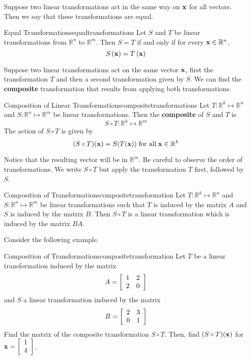 Suppose two linear transformations act in the same way on ${\bf x}$ for all vectors. Then we say that these transformations are equal.

\begin{definition}{Equal Transformations}{equaltransformations}
Let $S$ and $T$ be linear transformations from $\mathbb{R}^n$ to $\mathbb{R}^m$. Then $S = T$ if and only if for every ${\bf x} \in \mathbb{R}^n$, 
\[
S \left( {\bf x} \right) = T \left( {\bf x} \right)
\]
\end{definition}

Suppose two linear transformations act on the same vector ${\bf x}$, first the transformation $T$ and then a second transformation given by $S$. We can find the \textbf{composite} transformation that results from applying both transformations.

\begin{definition}{Composition of Linear Transformations}{compositetransformations}
Let $T: \mathbb{R}^k \mapsto \mathbb{R}^n$ and $S: \mathbb{R}^n \mapsto \mathbb{R}^m$ be linear transformations. Then the \textbf{composite} of $S$ and $T$ is 
\[
S \circ T: \mathbb{R}^k \mapsto \mathbb{R}^m
\]
The action of $S \circ T$ is given by 
\[
(S \circ T) ({\bf x}) = S(T({\bf x})) \; \mbox{for all} \; {\bf x} \in \mathbb{R}^k
\]
\end{definition}

Notice that the resulting vector will be in $\mathbb{R}^m$. Be careful to observe the order of transformations. We write $S \circ T$ but apply the transformation $T$ first, followed by $S$. 

\begin{theorem}{Composition of Transformations}{compositetransformation}
Let $T: \mathbb{R}^k \mapsto \mathbb{R}^n$ and $S: \mathbb{R}^n \mapsto \mathbb{R}^m$ be linear transformations such that $T$ is induced by the matrix $A$ and $S$ is induced by the matrix $B$. Then $S \circ T$ is a linear transformation which is induced by the matrix $BA$.
\end{theorem}

Consider the following example. 

\begin{example}{Composition of Transformations}{compositetransformation}
Let $T$ be a linear transformation induced by the matrix 
\[
A = 
\left[
\begin{array}{rr}
1 & 2 \\
2 & 0 
\end{array}
\right]
\]
and $S$ a linear transformation induced by the matrix
\[
B = 
\left[
\begin{array}{rr}
2 & 3 \\
0 & 1
\end{array}
\right]
\]
Find the matrix of the composite transformation $S \circ T$. Then, find $(S \circ T)({\bf x})$ for ${\bf x} = \left[
\begin{array}{r}
1 \\
4 
\end{array}
\right]$.
\end{example}

